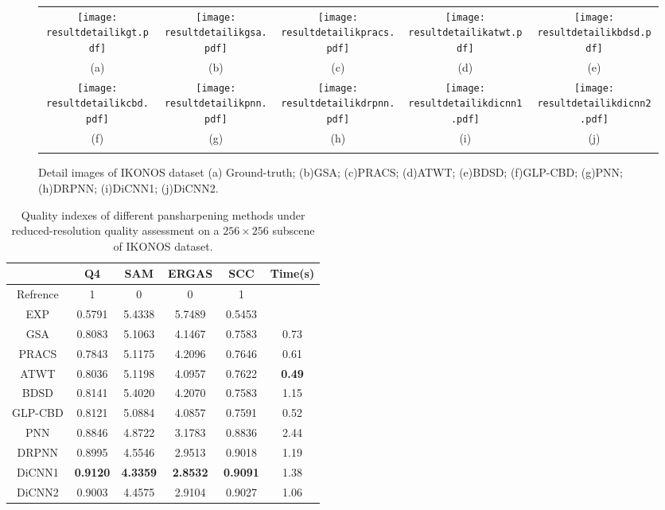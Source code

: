 \documentclass[journal]{IEEEtran}
\begin{document}
\begin{figure*}[t]\scriptsize
\centering
\begin{tabular}{ccccc}
\texttt{[image: resultdetailikgt.pdf]} &
\texttt{[image: resultdetailikgsa.pdf]} &
\texttt{[image: resultdetailikpracs.pdf]} &
\texttt{[image: resultdetailikatwt.pdf]} &
\texttt{[image: resultdetailikbdsd.pdf]} \\
(a) & (b) & (c) &(d) &(e) \\
\texttt{[image: resultdetailikcbd.pdf]} &
\texttt{[image: resultdetailikpnn.pdf]} &
\texttt{[image: resultdetailikdrpnn.pdf]} &
\texttt{[image: resultdetailikdicnn1.pdf]} &
\texttt{[image: resultdetailikdicnn2.pdf]} \\
(f) & (g) & (h) &(i) &(j)  \\
\\
\end{tabular}
\caption{Detail images of IKONOS dataset (a) Ground-truth;  (b)GSA; (c)PRACS; (d)ATWT; (e)BDSD; (f)GLP-CBD; (g)PNN; (h)DRPNN; (i)DiCNN1; (j)DiCNN2.}
\label{figure:detailimage:ik}
\end{figure*}

\begin{table}[htp]
\small
\caption{Quality indexes of different pansharpening methods under reduced-resolution quality assessment on a $256\times256$ subscene of IKONOS dataset.}
\centering
\begin{tabular}{c|ccccc}
\hline
{}&Q4&SAM& ERGAS &SCC&Time(s)\\
\hline
Refrence&1 &0 &0 &1&{}\\
\hline
\hline
EXP &0.5791 &5.4338 &5.7489 &0.5453 &{}\\
\hline
GSA&0.8083 &5.1063 &4.1467 &0.7583 &0.73\\
\hline
PRACS&0.7843 &5.1175 &4.2096 &0.7646 &0.61\\
\hline
ATWT&0.8036 &5.1198 &4.0957 &0.7622  &\textbf{0.49}\\
\hline
BDSD&0.8141 &5.4020 &4.2070 &0.7583 &1.15\\
\hline
GLP-CBD&0.8121 &5.0884 &4.0857 &0.7591 &0.52\\
\hline
\hline
PNN &0.8846 &4.8722 &3.1783 &0.8836&2.44\\
\hline
DRPNN &0.8995 &4.5546 &2.9513 &0.9018&1.19\\
\hline
DiCNN1 &\textbf{0.9120} &\textbf{4.3359} &\textbf{2.8532} &\textbf{0.9091}&1.38\\
\hline
DiCNN2 &0.9003 &4.4575 &2.9104 &0.9027&1.06\\
\hline
\end{tabular}
\label{table:reduceik}
\end{table}
\end{document}
